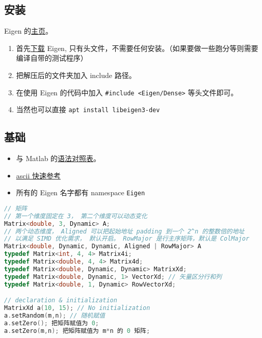 
\subsection{安装}
Eigen 的\href{http://eigen.tuxfamily.org/index.php?title=Main_Page}{主页}。
\begin{enumerate}
\item 首先\href{http://eigen.tuxfamily.org/index.php?title=Main_Page#Documentation}{下载} Eigen, 只有头文件，不需要任何安装。（如果要做一些跑分等则需要编译自带的测试程序）
\item 把解压后的文件夹加入 include 路径。
\item 在使用 Eigen 的代码中加入 \verb`#include <Eigen/Dense>` 等头文件即可。
\item 当然也可以直接 \verb`apt install libeigen3-dev`
\end{enumerate}

\subsection{基础}
\begin{itemize}
\item 与 Matlab 的\href{https://eigen.tuxfamily.org/dox/AsciiQuickReference.txt}{语法对照表}。
\item \href{https://eigen.tuxfamily.org/dox/AsciiQuickReference.txt}{ascii 快速参考}
\item 所有的 Eigen 名字都有 namespace \verb`Eigen`
\end{itemize}

\begin{lstlisting}[language=cpp]
// 矩阵
// 第一个维度固定在 3， 第二个维度可以动态变化
Matrix<double, 3, Dynamic> A;
// 两个动态维度， Aligned 可以把起始地址 padding 到一个 2^n 的整数倍的地址
// 以满足 SIMD 优化需求， 默认开启。 RowMajor 是行主序矩阵，默认是 ColMajor
Matrix<double, Dynamic, Dynamic, Aligned | RowMajor> A 
typedef Matrix<int, 4, 4> Matrix4i;
typedef Matrix<double, 4, 4> Matrix4d;
typedef Matrix<double, Dynamic, Dynamic> MatrixXd;
typedef Matrix<double, Dynamic, 1> VectorXd; // 矢量区分行和列
typedef Matrix<double, 1, Dynamic> RowVectorXd;

// declaration & initialization
MatrixXd a(10, 15); // No initialization
a.setRandom(m,n); // 随机赋值
a.setZero(); 把矩阵赋值为 0;
a.setZero(m,n); 把矩阵赋值为 m*n 的 0 矩阵;
\end{lstlisting}

